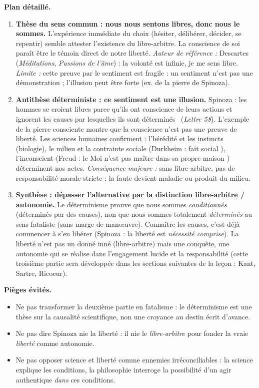 \documentclass[11pt]{article}
\newcommand{\cle}[1]{{\popxbold\color{popdark}#1}}
\begin{document}
\begin{exoresolu}
\textbf{Plan détaillé.}
\begin{enumerate}
\item \textbf{Thèse du sens commun : nous nous sentons libres, donc nous le sommes.} L'expérience immédiate du choix (hésiter, délibérer, décider, se repentir) semble attester l'existence du libre-arbitre. La conscience de soi paraît être le témoin direct de notre liberté. \textit{Auteur de référence :} Descartes (\emph{Méditations}, \emph{Passions de l'âme}) : la volonté est infinie, je me sens libre. \textit{Limite :} cette preuve par le sentiment est fragile : un sentiment n'est pas une démonstration ; l'illusion peut être forte (ex. de la pierre de Spinoza).
\item \textbf{Antithèse déterministe : ce sentiment est une illusion.} Spinoza : \guillemotleft les hommes se croient libres parce qu'ils ont conscience de leurs actions et ignorent les causes par lesquelles ils sont déterminés \guillemotright\ (\emph{Lettre 58}). L'exemple de la pierre consciente montre que la conscience n'est pas une preuve de liberté. Les sciences humaines confirment : l'hérédité et les instincts (biologie), le milieu et la contrainte sociale (Durkheim : \guillemotleft fait social \guillemotright), l'inconscient (Freud : le Moi \guillemotleft n'est pas maître dans sa propre maison \guillemotright) déterminent nos actes. \textit{Conséquence majeure :} sans libre-arbitre, pas de responsabilité morale stricte ; la faute devient maladie ou produit du milieu.
\item \textbf{Synthèse : dépasser l'alternative par la distinction libre-arbitre / autonomie.} Le déterminisme prouve que nous sommes \emph{conditionnés} (déterminés par des causes), non que nous sommes totalement \emph{déterminés} au sens fataliste (sans marge de manœuvre). Connaître les causes, c'est déjà commencer à s'en libérer (Spinoza : la liberté est \emph{nécessité comprise}). La liberté n'est pas un donné inné (libre-arbitre) mais une conquête, une \cle{autonomie} qui se réalise dans l'engagement lucide et la responsabilité (cette troisième partie sera développée dans les sections suivantes de la leçon : Kant, Sartre, Ricoeur).
\end{enumerate}
\textbf{Pièges évités.}
\begin{itemize}
\item Ne pas transformer la deuxième partie en fatalisme : le déterminisme est une thèse sur la causalité scientifique, non une croyance au destin écrit d'avance.
\item Ne pas dire \guillemotleft Spinoza nie la liberté \guillemotright : il nie le \emph{libre-arbitre} pour fonder la vraie \emph{liberté} comme autonomie.
\item Ne pas opposer science et liberté comme ennemies irréconciliables : la science explique les conditions, la philosophie interroge la possibilité d'un agir authentique \emph{dans} ces conditions.
\end{itemize}
\end{exoresolu}
\end{document}
